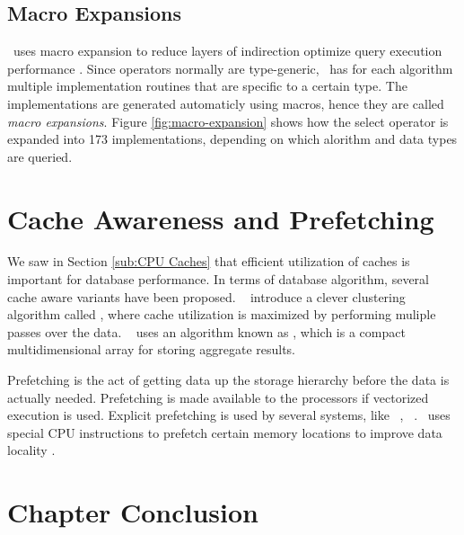 \subsection{Macro Expansions}
\label{sub:Macro Expansions}
\monetdb~uses macro expansion to reduce layers of indirection optimize query execution performance \cite{Boncz2002-yj}. Since operators normally are type-generic, \monetdb~has for each algorithm multiple implementation routines that are specific to a certain type. The implementations are generated automaticly using macros, hence they are called \textit{macro expansions}. Figure \ref{fig:macro-expansion} shows how the select operator is expanded into 173 implementations, depending on which alorithm and data types are queried.



\section{Cache Awareness and Prefetching}
\label{sec:Cache Awareness and Prefetching}
We saw in Section \ref{sub:CPU Caches} that efficient utilization of caches is important for database performance. In terms of database algorithm, several cache aware variants have been proposed. \monetdb~\cite{Boncz2002-yj} introduce a clever clustering algorithm called , where cache utilization is maximized by performing muliple passes over the data. \oracle~\cite{Lahiri2015-mz} uses an algorithm known as , which is a compact multidimensional array for storing aggregate results.

Prefetching is the act of getting data up the storage hierarchy before the data is actually needed. Prefetching is made available to the processors if vectorized execution is used. Explicit prefetching is used by several systems, like \ibm~\cite{Raman2013-em}, \monetx~\cite{Boncz2005-wj}. \exasol~uses special CPU instructions to prefetch certain memory locations to improve data locality \cite{Exasol2014-xh}.



\section{Chapter Conclusion}
\label{sec:Chapter Conclusion}

